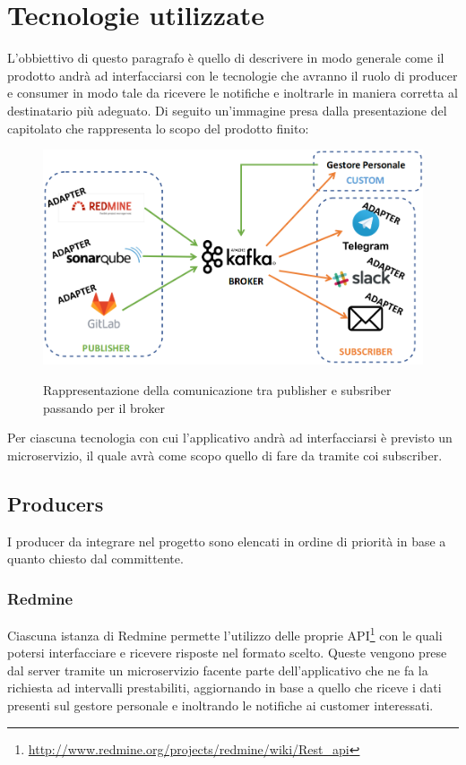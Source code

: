 \newpage
\section{Tecnologie utilizzate}
	L'obbiettivo di questo paragrafo è quello di descrivere in modo generale come il prodotto andrà ad interfacciarsi con le tecnologie che avranno il ruolo di producer e consumer in modo tale da ricevere le notifiche e inoltrarle in maniera corretta al destinatario più adeguato.
	Di seguito un'immagine presa dalla presentazione del capitolato che rappresenta lo scopo del prodotto finito:
	\vspace{-0.4cm}
	\begin{figure}[H]
		\centering
		\includegraphics[width=\columnwidth]{img/butterfly.png}\\
		\caption{Rappresentazione della comunicazione tra publisher e subsriber passando per il broker}
	\end{figure}

	Per ciascuna tecnologia con cui l'applicativo andrà ad interfacciarsi è previsto un microservizio, il quale avrà come scopo quello di fare da tramite coi subscriber.

	\subsection{Producers}
		I producer da integrare nel progetto sono elencati in ordine di priorità in base a quanto chiesto dal committente.

		\subsubsection{Redmine}
		Ciascuna istanza di Redmine permette l'utilizzo delle proprie API\footnote{\url{http://www.redmine.org/projects/redmine/wiki/Rest_api}} con le quali potersi interfacciare e ricevere risposte nel formato scelto.
		Queste vengono prese dal server tramite un microservizio facente parte dell'applicativo che ne fa la richiesta ad intervalli prestabiliti, aggiornando in base a quello che riceve i dati presenti sul gestore personale e inoltrando le notifiche ai customer interessati.
		
